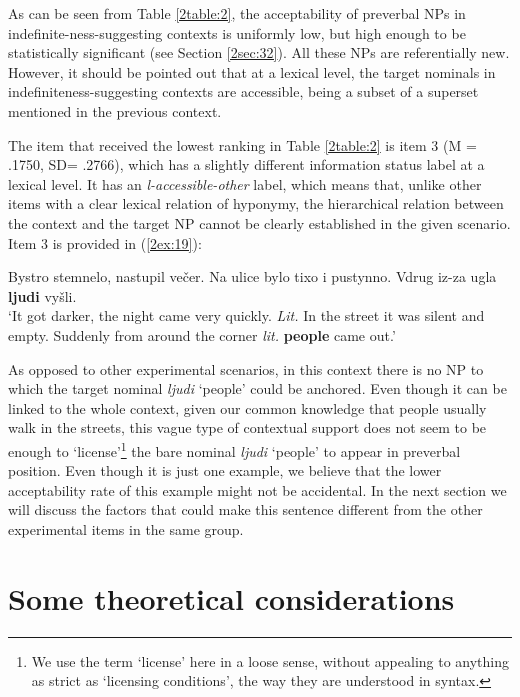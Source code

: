 \documentclass[output=paper]{langsci/langscibook}
\begin{document}
As can be seen from Table \ref{2table:2}, the acceptability of preverbal NPs in indefinite-ness-suggesting contexts is uniformly low, but high enough to be statistically significant (see Section \ref{2sec:32}). All these NPs are referentially new. However, it should be pointed out that at a lexical level, the target nominals in indefiniteness-suggesting contexts are accessible, being a subset of a superset mentioned in the previous context.

The item that received the lowest ranking in Table \ref{2table:2} is item 3 (M = .1750, SD= .2766), which has a slightly different information status label at a lexical level. It has an {\emph{l-accessible-other}} label, which means that, unlike other items with a clear lexical relation of hyponymy, the hierarchical relation between the context and the target NP cannot be clearly established in the given scenario. Item 3 is provided in (\ref{2ex:19}):

\begin{exe}
\ex\label{2ex:19}
Bystro stemnelo, nastupil ve\v{c}er. Na ulice bylo tixo i pustynno. Vdrug iz-za ugla {\bf{ljudi}} vy\v{s}li. \\
`It got darker, the night came very quickly. 
{\emph{Lit.}} In the street it was silent and empty. Suddenly from around the corner {\emph{lit.}} {\bf{people}} came out.'
\end{exe}

As opposed to other experimental scenarios, in this context there is no NP to which the target nominal {\emph{ljudi}} `people' could be anchored. Even though it can be linked to the whole context, given our common knowledge that people usually walk in the streets, this vague type of contextual support does not seem to be enough to `license'\footnote{We use the term `license' here in a loose sense, without appealing to anything as strict as `licensing conditions', the way they are understood in syntax.} the bare nominal {\emph{ljudi}} `people' to appear in preverbal position. Even though it is just one example, we believe that the lower acceptability rate of this example might not be accidental. In the next section we will discuss the factors that could make this sentence different from the other experimental items in the same group.


\section{Some theoretical considerations}\label{2sec:4}
\end{document}
